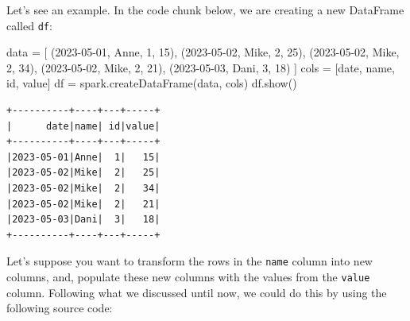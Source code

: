 \documentclass[
  11pt,
  letterpaper,
  DIV=11,
  numbers=noendperiod]{scrreprt}
\newenvironment{Shaded}{\begin{snugshade}}{\end{snugshade}}
\newcommand{\DecValTok}[1]{\textcolor[rgb]{0.68,0.00,0.00}{#1}}
\newcommand{\NormalTok}[1]{\textcolor[rgb]{0.00,0.23,0.31}{#1}}
\newcommand{\OperatorTok}[1]{\textcolor[rgb]{0.37,0.37,0.37}{#1}}
\newcommand{\StringTok}[1]{\textcolor[rgb]{0.13,0.47,0.30}{#1}}
\begin{document}
Let's see an example. In the code chunk below, we are creating a new
DataFrame called \texttt{df}:

\begin{Shaded}
\begin{Highlighting}[]
\NormalTok{data }\OperatorTok{=}\NormalTok{ [}
\NormalTok{    (}\StringTok{\textquotesingle{}2023{-}05{-}01\textquotesingle{}}\NormalTok{, }\StringTok{\textquotesingle{}Anne\textquotesingle{}}\NormalTok{, }\DecValTok{1}\NormalTok{, }\DecValTok{15}\NormalTok{),}
\NormalTok{    (}\StringTok{\textquotesingle{}2023{-}05{-}02\textquotesingle{}}\NormalTok{, }\StringTok{\textquotesingle{}Mike\textquotesingle{}}\NormalTok{, }\DecValTok{2}\NormalTok{, }\DecValTok{25}\NormalTok{),}
\NormalTok{    (}\StringTok{\textquotesingle{}2023{-}05{-}02\textquotesingle{}}\NormalTok{, }\StringTok{\textquotesingle{}Mike\textquotesingle{}}\NormalTok{, }\DecValTok{2}\NormalTok{, }\DecValTok{34}\NormalTok{),}
\NormalTok{    (}\StringTok{\textquotesingle{}2023{-}05{-}02\textquotesingle{}}\NormalTok{, }\StringTok{\textquotesingle{}Mike\textquotesingle{}}\NormalTok{, }\DecValTok{2}\NormalTok{, }\DecValTok{21}\NormalTok{),}
\NormalTok{    (}\StringTok{\textquotesingle{}2023{-}05{-}03\textquotesingle{}}\NormalTok{, }\StringTok{\textquotesingle{}Dani\textquotesingle{}}\NormalTok{, }\DecValTok{3}\NormalTok{, }\DecValTok{18}\NormalTok{)}
\NormalTok{]}
\NormalTok{cols }\OperatorTok{=}\NormalTok{ [}\StringTok{\textquotesingle{}date\textquotesingle{}}\NormalTok{, }\StringTok{\textquotesingle{}name\textquotesingle{}}\NormalTok{, }\StringTok{\textquotesingle{}id\textquotesingle{}}\NormalTok{, }\StringTok{\textquotesingle{}value\textquotesingle{}}\NormalTok{]}
\NormalTok{df }\OperatorTok{=}\NormalTok{ spark.createDataFrame(data, cols)}
\NormalTok{df.show()}
\end{Highlighting}
\end{Shaded}

\begin{verbatim}
+----------+----+---+-----+
|      date|name| id|value|
+----------+----+---+-----+
|2023-05-01|Anne|  1|   15|
|2023-05-02|Mike|  2|   25|
|2023-05-02|Mike|  2|   34|
|2023-05-02|Mike|  2|   21|
|2023-05-03|Dani|  3|   18|
+----------+----+---+-----+
\end{verbatim}

Let's suppose you want to transform the rows in the \texttt{name} column
into new columns, and, populate these new columns with the values from
the \texttt{value} column. Following what we discussed until now, we
could do this by using the following source code:
\end{document}
